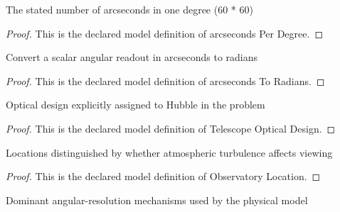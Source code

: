 \begin{definition}
  \label{def:physics:phyx-mini-0131:phyxminiproblems-problemphyxmini0131-arcsecondsperdegree}
  The stated number of arcseconds in one degree (60 * 60)
\end{definition}
\begin{proof}
  This is the declared model definition of arcseconds Per Degree.
\end{proof}
\begin{definition}
  \label{def:physics:phyx-mini-0131:phyxminiproblems-problemphyxmini0131-arcsecondstoradians}
  Convert a scalar angular readout in arcseconds to radians
\end{definition}
\begin{proof}
  This is the declared model definition of arcseconds To Radians.
\end{proof}
\begin{definition}
  \label{def:physics:phyx-mini-0131:phyxminiproblems-problemphyxmini0131-telescopeopticaldesign}
  Optical design explicitly assigned to Hubble in the problem
\end{definition}
\begin{proof}
  This is the declared model definition of Telescope Optical Design.
\end{proof}
\begin{definition}
  \label{def:physics:phyx-mini-0131:phyxminiproblems-problemphyxmini0131-observatorylocation}
  Locations distinguished by whether atmospheric turbulence affects viewing
\end{definition}
\begin{proof}
  This is the declared model definition of Observatory Location.
\end{proof}
\begin{definition}
  \label{def:physics:phyx-mini-0131:phyxminiproblems-problemphyxmini0131-resolutionlimitation}
  Dominant angular-resolution mechanisms used by the physical model
\end{definition}
